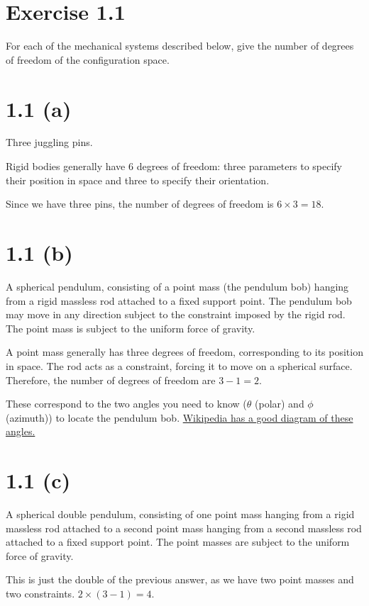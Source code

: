\documentclass{article}
\begin{document}
\section*{Exercise 1.1}

For each of the mechanical systems described below, give the number of
degrees of freedom of the configuration space.

\section*{1.1 (a)}

Three juggling pins.

Rigid bodies generally have 6 degrees of freedom: three parameters to
specify their position in space and three to specify their
orientation.

Since we have three pins, the number of degrees of freedom is
$6 \times 3 = \boxed{18}$.

\section*{1.1 (b)}

A spherical pendulum, consisting of a point mass (the pendulum bob)
hanging from a rigid massless rod attached to a fixed support point.
The pendulum bob may move in any direction subject to the constraint
imposed by the rigid rod. The point mass is subject to the uniform
force of gravity.

A point mass generally has three degrees of freedom, corresponding to
its position in space. The rod acts as a constraint, forcing it to
move on a spherical surface. Therefore, the number of degrees of
freedom are $3 - 1 = \boxed{2}$.

These correspond to the two angles you need to know ($\theta$ (polar)
and $\phi$ (azimuth)) to locate the pendulum bob.
\href{https://en.wikipedia.org/wiki/Spherical_pendulum}{Wikipedia has
  a good diagram of these angles.}

\section*{1.1 (c)}

A spherical double pendulum, consisting of one point mass hanging from
a rigid massless rod attached to a second point mass hanging from a
second massless rod attached to a fixed support point. The point
masses are subject to the uniform force of gravity.

This is just the double of the previous answer, as we have two point
masses and two constraints. $2 \times (3 - 1) = \boxed{4}$.
\end{document}
